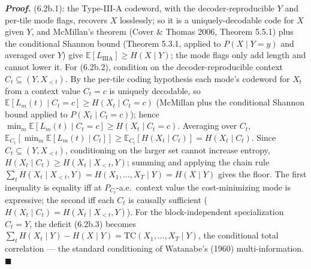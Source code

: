 \documentclass[
]{article}
\begin{document}
\emph{\textbf{Proof.}} (6.2b.1): the Type-III-A codeword, with the
decoder-reproducible $Y$ and per-tile mode flags, recovers $X$
losslessly; so it is a uniquely-decodable code for $X$ given $Y$, and
McMillan's theorem (Cover \& Thomas 2006, Theorem 5.5.1) plus the
conditional Shannon bound (Theorem 5.3.1, applied to $P(X \mid Y = y)$
and averaged over $Y$) give $\mathbb{E}[L_{\mathrm{IIIA}}] \ge
H(X \mid Y)$; the mode flags only add length and cannot lower it. For
(6.2b.2), condition on the decoder-reproducible context $C_t \subseteq
(Y, X_{<t})$. By the per-tile coding hypothesis each mode's codeword for
$X_t$ from a context value $C_t = c$ is uniquely decodable, so
$\mathbb{E}[L_m(t) \mid C_t = c] \ge H(X_t \mid C_t = c)$ (McMillan plus
the conditional Shannon bound applied to $P(X_t \mid C_t = c)$); hence
$\min_m \mathbb{E}[L_m(t) \mid C_t = c] \ge H(X_t \mid C_t = c)$.
Averaging over $C_t$,
$\mathbb{E}_{C_t}[\min_m \mathbb{E}[L_m(t)\mid C_t]] \ge
\mathbb{E}_{C_t}[H(X_t \mid C_t)] = H(X_t \mid C_t)$. Since
$C_t \subseteq (Y, X_{<t})$, conditioning on the larger set cannot
increase entropy, $H(X_t \mid C_t) \ge H(X_t \mid X_{<t}, Y)$; summing
and applying the chain rule $\sum_t H(X_t \mid X_{<t}, Y) =
H(X_1,\ldots,X_T \mid Y) = H(X \mid Y)$ gives the floor. The first
inequality is equality iff at $P_{C_t}$-a.e.\ context value the
cost-minimizing mode is expressive; the second iff each $C_t$ is causally
sufficient ($H(X_t \mid C_t) = H(X_t \mid X_{<t}, Y)$). For the
block-independent specialization $C_t = Y$, the deficit (6.2b.3) becomes
$\sum_t H(X_t \mid Y) - H(X \mid Y) = \mathrm{TC}(X_1,\ldots,X_T \mid Y)$,
the conditional total correlation --- the standard conditioning of
Watanabe's (1960) multi-information. \hfill$\blacksquare$
\end{document}
